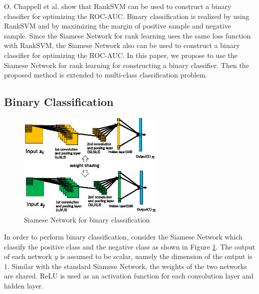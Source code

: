 \documentclass[twocolumn,10pt]{article}
\begin{document}
O. Chappell et al. \cite{ROCAUC} show that RankSVM can be used to construct a binary classifier for optimizing the ROC-AUC.
Binary classification is realized by using RankSVM and by maximizing the margin of positive sample and negative sample. 
Since the Siamese Network for rank learning uses the same loss function with RankSVM,
the Siamese Network also can be used to construct a binary classifier for optimizing the ROC-AUC.
In this paper, we propose to use the Siamese Network for rank learning for constructing a binary classifier.
Then the proposed method is extended to multi-class classification problem.


\subsection{Binary Classification}
\thispagestyle{empty}

\begin{figure}[ht]
\begin{center}
\includegraphics[width=70mm]{figure2.eps}
\caption{Siamese Network for binary classification}
\label{fig:siamese-bi}
\end{center}
\end{figure}

In order to perform binary classification, consider the Siamese Network which classify the positive class and the negative class as shown in Figure \ref{fig:siamese-bi}.
The output of each network $y$ is assumed to be scalar, namely the dimension of the output is $1$.
Similar with the standard Siamese Network, the weights of the two networks are shared.
ReLU is used as an activation function for each convolution layer and hidden layer. 
\end{document}
